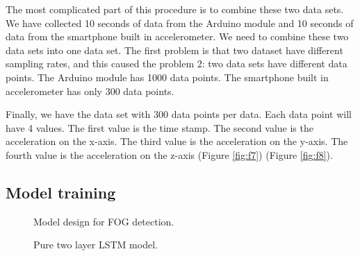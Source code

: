 \documentclass[10pt,twocolumn,letterpaper]{article}
\begin{document}
    The most complicated part of this procedure is to combine these two data sets. We have collected 10 seconds of data from the Arduino module and 10 seconds of data from the smartphone built in accelerometer. We need to combine these two data sets into one data set. The first problem is that two dataset have different sampling rates, and this caused the problem 2: two data sets have different data points. The Arduino module has 1000 data points. The smartphone built in accelerometer has only 300 data points.

    Finally, we have the data set with 300 data points per data. Each data point will have 4 values. The first value is the time stamp. The second value is the acceleration on the x-axis. The third value is the acceleration on the y-axis. The fourth value is the acceleration on the z-axis (Figure \ref{fig:f7}) (Figure \ref{fig:f8}).

\subsection{Model training}
\label{sec:model_training}

\begin{figure}[t]
    \centering
    \caption{Model design for FOG detection.}
    \label{fig:f9}
\end{figure}

\begin{figure}[t]
    \centering
    \caption{Pure two layer LSTM model.}
    \label{fig:f10}
\end{figure}
\end{document}
